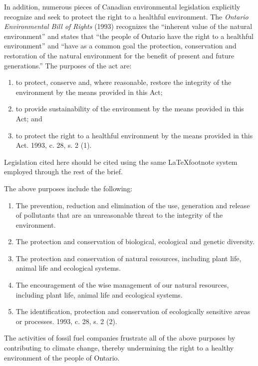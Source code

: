 In addition, numerous pieces of Canadian environmental legislation explicitly recognize and seek to protect the right to a healthful environment.
The \emph{Ontario Environmental Bill of Rights} (1993) recognizes the ``inherent value of the natural environment'' and states that ``the people of Ontario have the right to a healthful environment'' and ``have as a common goal the protection, conservation and restoration of the natural environment for the benefit of present and future generations.''  
The purposes of the act are:
\begin{enumerate}
	\item to protect, conserve and, where reasonable, restore the integrity of the environment by the means provided in this Act;
	\item to provide sustainability of the environment by the means provided in this Act; and
	\item to protect the right to a healthful environment by the means provided in this Act.  1993, c. 28, s. 2 (1).
\end{enumerate}

\begin{vcom}
	Legislation cited here should be cited using the same \LaTeX footnote system employed through the rest of the brief.
\end{vcom}


The above purposes include the following:
\begin{enumerate}
	\item The prevention, reduction and elimination of the use, generation and release of pollutants that are an unreasonable threat to the integrity of the environment.
	\item The protection and conservation of biological, ecological and genetic diversity.
	\item The protection and conservation of natural resources, including plant life, animal life and ecological systems.
	\item The encouragement of the wise management of our natural resources, including plant life, animal life and ecological systems.
	\item The identification, protection and conservation of ecologically sensitive areas or processes.  1993, c. 28, s. 2 (2). 
\end{enumerate}



The activities of fossil fuel companies frustrate all of the above purposes by contributing to climate change, thereby undermining the right to a healthy environment of the people of Ontario.

